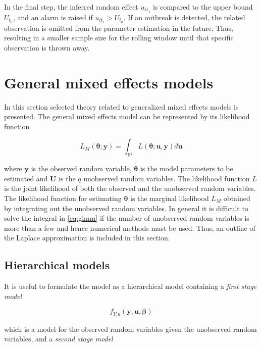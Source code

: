 \documentclass[a4paper,twoside,11pt]{report} %
\theoremstyle{definition}
\theoremstyle{definition}
\theoremstyle{definition}
\theoremstyle{definition}
\theoremstyle{remark}
\begin{document}
In the final step, the inferred random effect \(u_{i{t}_1}\) is compared to the upper bound \(U_{t_0}\), and an alarm is raised if \(u_{i{t}_1}>U_{t_0}\). If an outbreak is detected, the related observation is omitted from the parameter estimation in the future. Thus, resulting in a smaller sample size for the rolling window until that specific observation is thrown away.

\section{General mixed effects models}\label{GLMM}

In this section selected theory related to generalized mixed effects models is presented. The general mixed effects model can be represented by its likelihood function

\begin{equation}\label{eq:glmm}
  L_{M}(\boldsymbol{\theta; y})=\int_{\mathbb{R}^{q}} L(\boldsymbol{\theta;u,y}) d\boldsymbol{u}
\end{equation}

where \(\boldsymbol{y}\) is the observed random variable, \(\boldsymbol{\theta}\) is the model parameters to be estimated and \(\boldsymbol{U}\) is the \(q\) unobserved random variables. The likelihood function \(L\) is the joint likelihood of both the observed and the unobserved random variables. The likelihood function for estimating \(\boldsymbol{\theta}\) is the marginal likelihood \(L_{M}\) obtained by integrating out the unobserved random variables. In general it is difficult to solve the integral in \eqref{eq:glmm} if the number of unobserved random variables is more than a few and hence numerical methods must be used. Thus, an outline of the Laplace approximation is included in this section.

\subsection{Hierarchical models}\label{hierarchicalModels}

It is useful to formulate the model as a hierarchical model containing a \textit{first stage model}

\begin{equation}
  f_{Y|u}(\boldsymbol{y;u,\beta})
\end{equation}

which is a model for the observed random variables given the unobserved random variables, and a \textit{second stage model}
\end{document}
